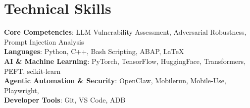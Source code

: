 \documentclass[letterpaper,11pt]{article}
\begin{document}
\section{Technical Skills}
 \begin{itemize}[leftmargin=0.15in, label={}]
    \small{\item{
      \textbf{Core Competencies}{: LLM Vulnerability Assessment, Adversarial Robustness, Prompt Injection Analysis} \\
     \textbf{Languages}{: Python, C++, Bash Scripting, ABAP, LaTeX} \\
     \textbf{AI \& Machine Learning}{: PyTorch, TensorFlow, HuggingFace, Transformers, PEFT, scikit-learn} \\
     \textbf{Agentic Automation \& Security}{: OpenClaw, Mobilerun, Mobile-Use, Playwright, } \\
     \textbf{Developer Tools}{: Git, VS Code, ADB} \\
    }}
 \end{itemize}


\end{document}
